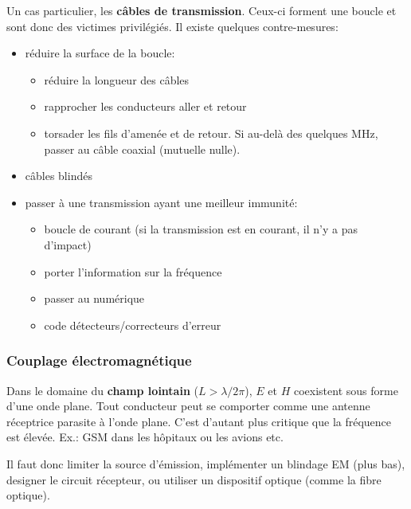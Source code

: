 Un cas particulier, les \textbf{câbles de transmission}. Ceux-ci forment une boucle et sont donc des victimes privilégiés. Il existe quelques contre-mesures:
\begin{itemize}
	\item réduire la surface de la boucle:
	\begin{itemize}
		\item réduire la longueur des câbles
		\item rapprocher les conducteurs aller et retour
		\item torsader les fils d'amenée et de retour. Si au-delà des quelques \si{\mega\hertz}, passer au câble coaxial (mutuelle nulle).
	\end{itemize}
	\item câbles blindés
	\item passer à une transmission ayant une meilleur immunité:
	\begin{itemize}
		\item boucle de courant (si la transmission est en courant, il n'y a pas d'impact)
		\item porter l'information sur la fréquence
		\item passer au numérique
		\item code détecteurs/correcteurs d'erreur
	\end{itemize}
\end{itemize}

\subsubsection{Couplage électromagnétique}
Dans le domaine du \textbf{champ lointain} (\(L>\lambda/2\pi\)), \(E\) et \(H\) coexistent sous forme d'une onde plane. Tout conducteur peut se comporter comme une antenne réceptrice parasite à l'onde plane. C'est d'autant plus critique que la fréquence est élevée. Ex.: GSM dans les hôpitaux ou les avions etc.\bigbreak

Il faut donc limiter la source d'émission, implémenter un blindage EM (plus bas), designer le circuit récepteur, ou  utiliser un dispositif optique (comme la fibre optique).
